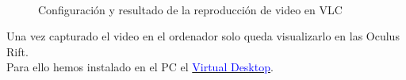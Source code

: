 \documentclass[twoside, 11pt]{epstfg}
\begin{document}
\begin{figure}[H]
	\centering
	\\
		\caption{Configuración y resultado de la reproducción de video en VLC} 
		\label{figstream}
\end{figure}

Una vez capturado el video en el ordenador solo queda visualizarlo en las Oculus Rift.\\
Para ello hemos instalado en el PC el \href{http://store.steampowered.com/app/382110/}{\textcolor{blue}{Virtual Desktop}}. 
\end{document}
